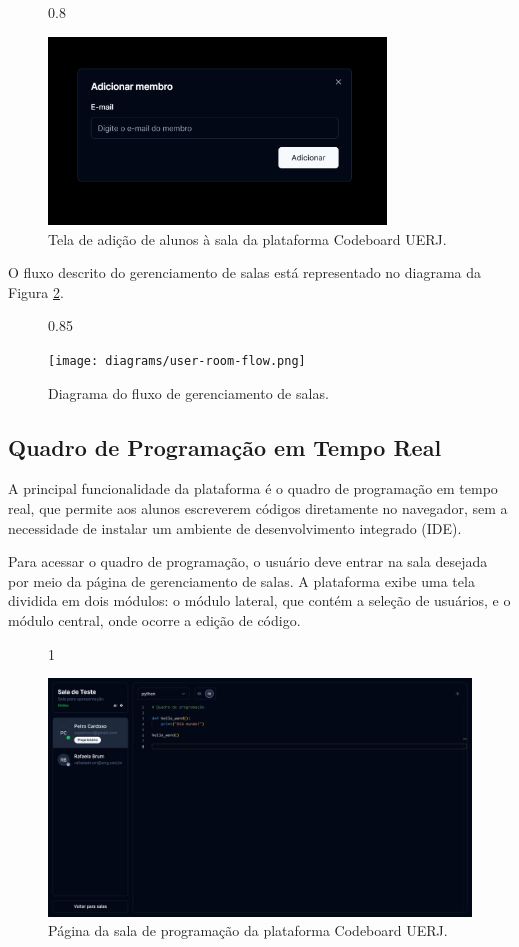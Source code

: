 \begin{figure}[H]{0.8\textwidth}
    \centering
    \caption{Tela de adição de alunos à sala da plataforma Codeboard UERJ.}
    \label{fig:add-member-modal}
    \includegraphics[width=0.8\textwidth]{assets/codeboard/add-member-modal.png}
\end{figure}


O fluxo descrito do gerenciamento de salas está representado no diagrama da Figura \ref{fig:user-room-flow}.


\begin{figure}[H]{0.85\textwidth}
    \centering
    \caption{Diagrama do fluxo de gerenciamento de salas.}
    \label{fig:user-room-flow}
    \texttt{[image: diagrams/user-room-flow.png]}
\end{figure}

\subsection{Quadro de Programação em Tempo Real}

A principal funcionalidade da plataforma é o quadro de programação em tempo real, que permite aos alunos escreverem códigos diretamente no navegador, sem a necessidade de instalar um ambiente de desenvolvimento integrado (IDE).

Para acessar o quadro de programação, o usuário deve entrar na sala desejada por meio da página de gerenciamento de salas. A plataforma exibe uma tela dividida em dois módulos: o módulo lateral, que contém a seleção de usuários, e o módulo central, onde ocorre a edição de código.

\begin{figure}[H]{1\textwidth}
    \centering
    \caption{Página da sala de programação da plataforma Codeboard UERJ.}
    \label{fig:room-details-page}
    \includegraphics[width=1\textwidth]{assets/codeboard/room-details-page.png}
\end{figure}

